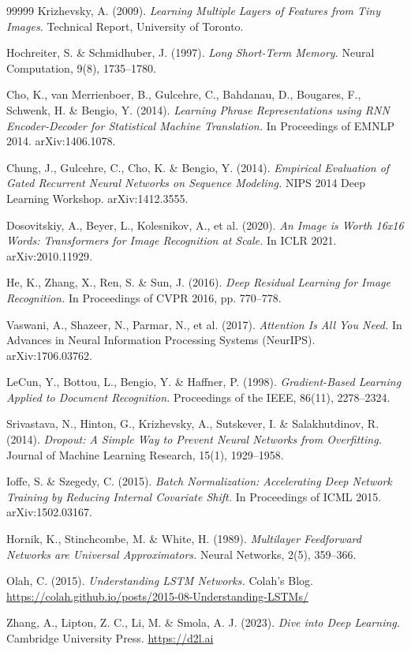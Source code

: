 \documentclass[a4paper]{article}
\theoremstyle{definition}
\begin{document}
\begin{thebibliography}{99999}
	Krizhevsky, A. (2009).
	{\em Learning Multiple Layers of Features from Tiny Images.}
	Technical Report, University of Toronto.

	Hochreiter, S. \& Schmidhuber, J. (1997).
	{\em Long Short-Term Memory.}
	Neural Computation, 9(8), 1735--1780.

	Cho, K., van Merrienboer, B., Gulcehre, C., Bahdanau, D., Bougares, F., Schwenk, H. \& Bengio, Y. (2014).
	{\em Learning Phrase Representations using RNN Encoder-Decoder for Statistical Machine Translation.}
	In Proceedings of EMNLP 2014. arXiv:1406.1078.

	Chung, J., Gulcehre, C., Cho, K. \& Bengio, Y. (2014).
	{\em Empirical Evaluation of Gated Recurrent Neural Networks on Sequence Modeling.}
	NIPS 2014 Deep Learning Workshop. arXiv:1412.3555.

	Dosovitskiy, A., Beyer, L., Kolesnikov, A., et al. (2020).
	{\em An Image is Worth 16x16 Words: Transformers for Image Recognition at Scale.}
	In ICLR 2021. arXiv:2010.11929.

	He, K., Zhang, X., Ren, S. \& Sun, J. (2016).
	{\em Deep Residual Learning for Image Recognition.}
	In Proceedings of CVPR 2016, pp. 770--778.

	Vaswani, A., Shazeer, N., Parmar, N., et al. (2017).
	{\em Attention Is All You Need.}
	In Advances in Neural Information Processing Systems (NeurIPS). arXiv:1706.03762.

	LeCun, Y., Bottou, L., Bengio, Y. \& Haffner, P. (1998).
	{\em Gradient-Based Learning Applied to Document Recognition.}
	Proceedings of the IEEE, 86(11), 2278--2324.

	Srivastava, N., Hinton, G., Krizhevsky, A., Sutskever, I. \& Salakhutdinov, R. (2014).
	{\em Dropout: A Simple Way to Prevent Neural Networks from Overfitting.}
	Journal of Machine Learning Research, 15(1), 1929--1958.

	Ioffe, S. \& Szegedy, C. (2015).
	{\em Batch Normalization: Accelerating Deep Network Training by Reducing Internal Covariate Shift.}
	In Proceedings of ICML 2015. arXiv:1502.03167.

	Hornik, K., Stinchcombe, M. \& White, H. (1989).
	{\em Multilayer Feedforward Networks are Universal Approximators.}
	Neural Networks, 2(5), 359--366.

	Olah, C. (2015).
	{\em Understanding LSTM Networks.}
	Colah's Blog. \url{https://colah.github.io/posts/2015-08-Understanding-LSTMs/}

	Zhang, A., Lipton, Z. C., Li, M. \& Smola, A. J. (2023).
	{\em Dive into Deep Learning.}
	Cambridge University Press. \url{https://d2l.ai}
\end{thebibliography}
\end{document}
